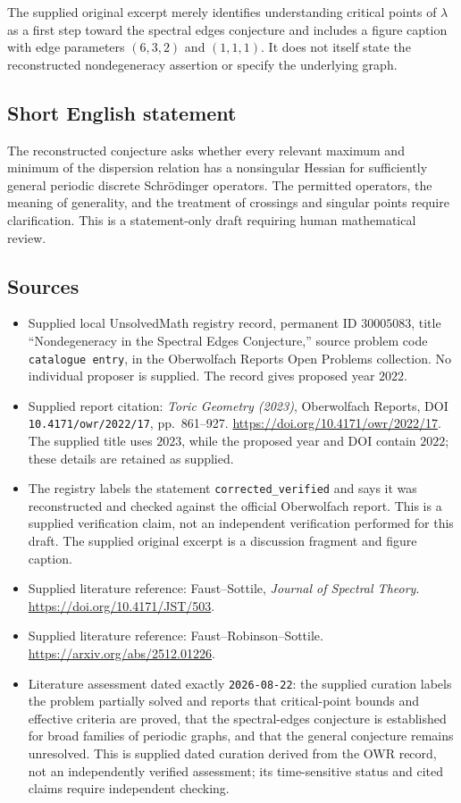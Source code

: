 \documentclass[11pt]{article}
\begin{document}
The supplied original excerpt merely identifies understanding critical points of \(\lambda\) as a first step toward the spectral edges conjecture and includes a figure caption with edge parameters \((6,3,2)\) and \((1,1,1)\). It does not itself state the reconstructed nondegeneracy assertion or specify the underlying graph.
\subsection{Short English statement}
The reconstructed conjecture asks whether every relevant maximum and minimum of the dispersion relation has a nonsingular Hessian for sufficiently general periodic discrete Schrödinger operators. The permitted operators, the meaning of generality, and the treatment of crossings and singular points require clarification. This is a statement-only draft requiring human mathematical review.
\subsection{Sources}
\begin{itemize}
\item Supplied local UnsolvedMath registry record, permanent ID \(30005083\), title ``Nondegeneracy in the Spectral Edges Conjecture,'' source problem code \texttt{catalogue entry}, in the Oberwolfach Reports Open Problems collection. No individual proposer is supplied. The record gives proposed year \(2022\).
\item Supplied report citation: \emph{Toric Geometry (2023)}, Oberwolfach Reports, DOI \texttt{10.4171/owr/2022/17}, pp.\ 861--927. \url{https://doi.org/10.4171/owr/2022/17}. The supplied title uses \(2023\), while the proposed year and DOI contain \(2022\); these details are retained as supplied.
\item The registry labels the statement \texttt{corrected\_verified} and says it was reconstructed and checked against the official Oberwolfach report. This is a supplied verification claim, not an independent verification performed for this draft. The supplied original excerpt is a discussion fragment and figure caption.
\item Supplied literature reference: Faust--Sottile, \emph{Journal of Spectral Theory}. \url{https://doi.org/10.4171/JST/503}.
\item Supplied literature reference: Faust--Robinson--Sottile. \url{https://arxiv.org/abs/2512.01226}.
\item Literature assessment dated exactly \texttt{2026-08-22}: the supplied curation labels the problem partially solved and reports that critical-point bounds and effective criteria are proved, that the spectral-edges conjecture is established for broad families of periodic graphs, and that the general conjecture remains unresolved. This is supplied dated curation derived from the OWR record, not an independently verified assessment; its time-sensitive status and cited claims require independent checking.
\end{itemize}
\end{document}
